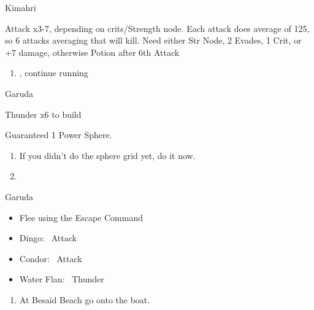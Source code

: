 \begin{battle}[750]{Kimahri}
	\begin{itemize}
		\tidusf Attack x3-7, depending on crits/Strength node.
		\tidusf Each attack does average of 125, so 6 attacks averaging that will kill.
		\tidusf Need either Str Node, 2 Evades, 1 Crit, or +7 damage, otherwise Potion after 6th Attack
	\end{itemize}
\end{battle}
\begin{enumerate}[resume]
	\item \sd, continue running
\end{enumerate}
\begin{battle}{Garuda}
	\begin{itemize}
		\summon{\valefor}
		\valeforf Thunder x6 to build \od
	\end{itemize}
Guaranteed 1 Power Sphere.
\end{battle}
\begin{enumerate}[resume]
	\item If you didn't do the sphere grid yet, do it now.
	\item \formation{\tidus}{\yuna}{\lulu}
\end{enumerate}
\begin{battle}{Garuda}
	\begin{itemize}
		\item Flee using the Escape Command
	\end{itemize}
\end{battle}
\begin{encounters}
	\begin{itemize}
		\item Dingo: \tidus\ Attack
		\item Condor: \wakka\ Attack
		\item Water Flan: \lulu\ Thunder
	\end{itemize}
\end{encounters}
\begin{enumerate}[resume]
	\item At Besaid Beach go onto the boat.
\end{enumerate}
